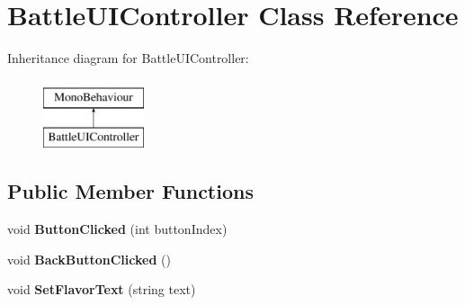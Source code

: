 \hypertarget{class_battle_u_i_controller}{\section{Battle\-U\-I\-Controller Class Reference}
\label{class_battle_u_i_controller}
}
Inheritance diagram for Battle\-U\-I\-Controller\-:\begin{figure}[H]
\begin{center}
\leavevmode
\includegraphics[height=2.000000cm]{class_battle_u_i_controller}
\end{center}
\end{figure}
\subsection*{Public Member Functions}
\begin{DoxyCompactItemize}
\item 
\hypertarget{group__client_ga3a85307f98994f49ffcb122ad836895f}{void {\bfseries Button\-Clicked} (int button\-Index)}\label{group__client_ga3a85307f98994f49ffcb122ad836895f}

\item 
\hypertarget{group__client_ga7cdd677370faa1526e0774b2b070e6fd}{void {\bfseries Back\-Button\-Clicked} ()}\label{group__client_ga7cdd677370faa1526e0774b2b070e6fd}

\item 
\hypertarget{group__client_ga05427e5dab5da5027fd3f12526e7d98c}{void {\bfseries Set\-Flavor\-Text} (string text)}\label{group__client_ga05427e5dab5da5027fd3f12526e7d98c}

\end{DoxyCompactItemize}
